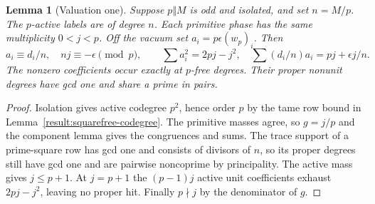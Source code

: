 \documentclass[11pt]{amsart}
\numberwithin{equation}{section}
\newtheorem{lemma}[theorem]{Lemma}
\theoremstyle{definition}
\theoremstyle{plain}
\begin{document}
\begin{lemma}[Valuation one]\label{result:weyl}
Suppose $p\Vert M$ is odd and isolated, and set $n=M/p$. The
$p$-active labels are of degree $n$. Each primitive phase has the
same multiplicity $0<j<p$. Off the vacuum set $a_i=p\epsilon(w_p)_i$.
Then
\begin{equation}
 a_i\equiv d_i/n,\quad nj\equiv-\epsilon\pmod p,\qquad
 \sum a_i^2=2pj-j^2,\quad \sum (d_i/n)a_i=pj+\epsilon j/n .
\end{equation}
The nonzero coefficients occur exactly at $p$-free degrees. Their
proper nonunit degrees have gcd one and share a prime in pairs.
\end{lemma}
\begin{proof}
Isolation gives active codegree $p^2$, hence order $p$ by the tame
row bound in Lemma~\ref{result:squarefree-codegree}. The primitive masses agree,
so $g=j/p$ and the component lemma gives the congruences and sums.
The trace support of a prime-square row has gcd one and consists
of divisors of $n$, so its proper degrees still have gcd one and
are pairwise noncoprime by principality. The active mass gives
$j\le p+1$. At $j=p+1$ the $(p-1)j$ active unit coefficients
exhaust $2pj-j^2$, leaving no proper hit. Finally $p\nmid j$ by
the denominator of $g$.
\end{proof}
\end{document}
